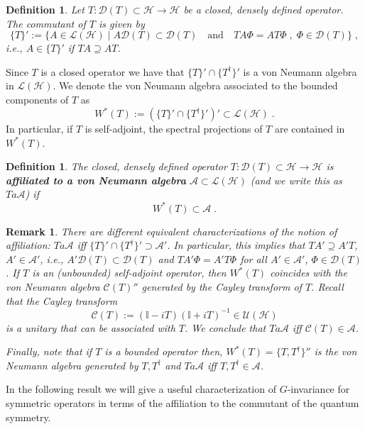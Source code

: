 \documentclass[a4paper,12pt]{amsart}
\renewcommand{\H}{\mathcal{H}}
\newcommand{\1}{\mathbb{I}}
\newtheorem{definition}[theorem]{Definition}
\newtheorem{remark}[theorem]{Remark}
\numberwithin{equation}{section}
\numberwithin{theorem}{section}
\begin{document}
\begin{definition}\label{def:com}
Let $T\colon\mathcal{D}(T)\subset\mathcal{H}\to \H$ be a closed, densely defined operator. The commutant of $T$
is given by 
\[
 \{T\}':=\{A\in\mathcal{L}(\mathcal{H})\mid A\mathcal{D}(T)\subset \mathcal{D}(T)\quad\mathrm{and}\quad
           TA\Phi=AT\Phi\;,\; \Phi\in\mathcal{D}(T)\}\;,
\]
i.e., $A\in\{T\}'$ if $TA\supseteq AT$.
\end{definition}

Since $T$ is a closed operator we have that $\{T\}'\cap \{T^\dagger\}'$ is a von Neumann algebra in $\mathcal{L}(\mathcal{H})$.
We denote the von Neumann algebra associated to the bounded components of $T$ as
\[
 W^*(T):=\left(\{T\}'\cap \{T^\dagger\}'\right)'\subset\mathcal{L}(\mathcal{H})\;.
\]
In particular, if $T$ is self-adjoint, the spectral projections of $T$ are contained in 
$W^*(T)$.
\begin{definition}\label{def:affi}
The closed, densely defined operator $T\colon\mathcal{D}(T)\subset\mathcal{H}\to \H$ is {\bf affiliated to a von Neumann algebra}
$\mathcal A\subset\mathcal{L}(\mathcal{H})$ (and we write this as $T a \mathcal A$) if
\[
 W^*(T)\subset\mathcal{A}\;.
\]
\end{definition}

\begin{remark}
There are different equivalent characterizations of the notion of affiliation: 
$Ta \mathcal A$ iff $\{T\}'\cap \{T^\dagger\}'\supset\mathcal{A}'$. In particular, this implies that
$TA'\supseteq A'T$, $A'\in\mathcal{A}'$, i.e., $A' \mathcal{D}(T)\subset \mathcal{D}(T)$ and 
$TA'\Phi= A'T\Phi$ for all $A'\in\mathcal{A}'$, $\Phi\in\mathcal{D}(T)$.
If $T$ is an (unbounded) self-adjoint operator, then
$W^*(T)$ coincides with the von Neumann algebra $\mathcal{C}(T)''$ generated by the Cayley transform of $T$. 
Recall that the Cayley transform
\[
 \mathcal{C}(T):=(\1-i T)(\1+iT)^{-1}\in\mathcal{U}(\mathcal{H})
\]
is a unitary that can be associated with $T$. We conclude that $T a \mathcal{A}$ iff $\mathcal{C}(T)\in\mathcal{A}$.

Finally, note that if $T$ is a bounded operator then, $W^*(T)=\{T,T^\dagger\}''$ is the von Neumann algebra generated by
$T, T^\dagger$ and $T a \mathcal A$ iff $T, T^\dagger\in\mathcal{A}$. 
\end{remark}


In the following result we will give a useful characterization of $G$-invariance for symmetric operators
in terms of the affiliation to the commutant of the quantum symmetry.
\end{document}
